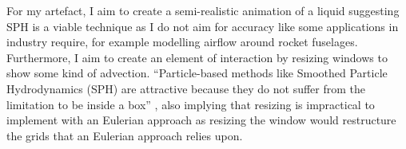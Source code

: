 \documentclass[write-up.tex]{subfiles}
\begin{document}
For my artefact, I aim to create a semi-realistic animation of a liquid suggesting SPH is a viable technique as I do not aim for accuracy like some applications in industry require, for example modelling airflow around rocket fuselages. Furthermore, I aim to create an element of interaction by resizing windows to show some kind of advection. ``Particle-based methods like Smoothed Particle Hydrodynamics (SPH) are attractive because they do not suffer from the limitation to be inside a box'' \cite{cohen}, also implying that resizing is impractical to implement with an Eulerian approach as resizing the window would restructure the grids that an Eulerian approach relies upon.

\end{document}
